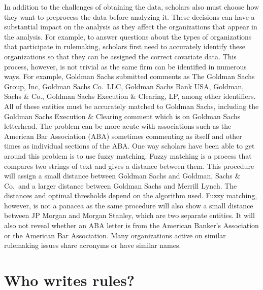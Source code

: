 \documentclass[
      12pt,
        ]{article}
\begin{document}
\indent In addition to the challenges of obtaining the data, scholars
also must choose how they want to preprocess the data before analyzing
it. These decisions can have a substantial impact on the analysis as
they affect the organizations that appear in the analysis. For example,
to answer questions about the types of organizations that participate in
rulemaking, scholars first need to accurately identify these
organizations so that they can be assigned the correct covariate data.
This process, however, is not trivial as the same firm can be identified
in numerous ways. For example, Goldman Sachs submitted comments as The
Goldman Sachs Group, Inc, Goldman Sachs Co.~LLC, Goldman Sachs Bank USA,
Goldman, Sachs \& Co., Goldman Sachs Execution \& Clearing, LP, among
other identifiers. All of these entities must be accurately matched to
Goldman Sachs, including the Goldman Sachs Execution \& Clearing comment
which is on Goldman Sachs letterhead. The problem can be more acute with
associations such as the American Bar Association (ABA) sometimes
commenting as itself and other times as individual sections of the ABA.
One way scholars have been able to get around this problem is to use
fuzzy matching. Fuzzy matching is a process that compares two strings of
text and gives a distance between them. This procedure will assign a
small distance between Goldman Sachs and Goldman, Sachs \& Co.~and a
larger distance between Goldman Sachs and Merrill Lynch. The distances
and optimal thresholds depend on the algorithm used. Fuzzy matching,
however, is not a panacea as the same procedure will also show a small
distance between JP Morgan and Morgan Stanley, which are two separate
entities. It will also not reveal whether an ABA letter is from the
American Banker's Association or the American Bar Association. Many
organizations active on similar rulemaking issues share acronyms or have
similar names.

\hypertarget{who-writes-rules}{%
\section{Who writes rules?}\label{who-writes-rules}}
\end{document}
